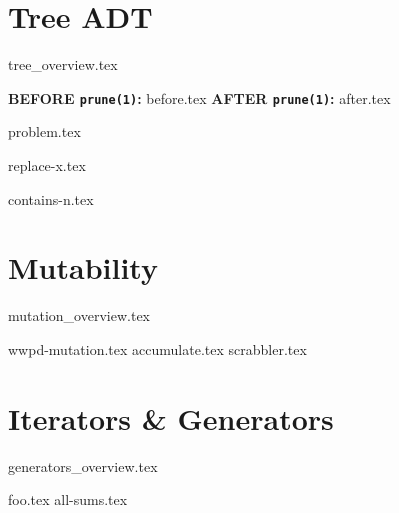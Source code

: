 \documentclass{exam}
\begin{document}
\section{Tree ADT}
{tree_overview.tex}
\begin{questions}
    \newpage
     \begin{blocksection}
        \textbf{BEFORE \lstinline{prune(1)}:}
        {before.tex}
        \hspace{0.5in}
        \textbf{AFTER \lstinline{prune(1)}:}
        {after.tex}
        \end{blocksection}
        
    
        {problem.tex}
    
        {replace-x.tex}

        {contains-n.tex}
\end{questions}

\newpage

\section{Mutability}
{mutation_overview.tex}
	\begin{questions}
	    {wwpd-mutation.tex}
        {accumulate.tex}
        \newpage
        {scrabbler.tex}
\end{questions}

\newpage
\section{Iterators \& Generators}
{generators_overview.tex}
\begin{questions}
    {foo.tex}
    {all-sums.tex}
\end{questions}
\end{document}
